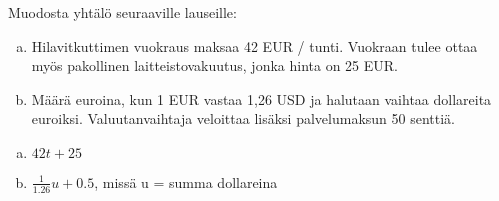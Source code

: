 \begin{tehtava}
    Muodosta yhtälö seuraaville lauseille:
    \begin{enumerate}[(a)]
        \item Hilavitkuttimen vuokraus maksaa 42 EUR / tunti. Vuokraan tulee ottaa myös pakollinen laitteistovakuutus, jonka hinta on 25 EUR.
        \item Määrä euroina, kun 1 EUR vastaa 1,26 USD ja halutaan vaihtaa dollareita euroiksi. Valuutanvaihtaja veloittaa lisäksi palvelumaksun 50 senttiä.
    \end{enumerate}
    \begin{vastaus}
        \begin{enumerate}[(a)]
            \item $42t + 25$
            \item $\frac{1}{1.26}u + 0.5$, missä u = summa dollareina
        \end{enumerate}
    \end{vastaus}
\end{tehtava}
